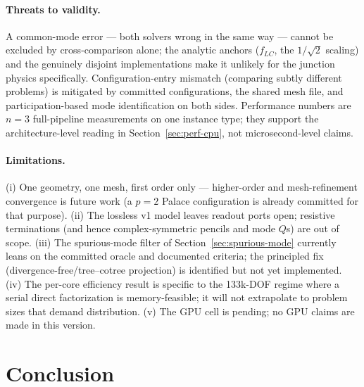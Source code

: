 \documentclass{anvil-paper}
\begin{document}
\paragraph{Threats to validity.}
A common-mode error --- both solvers wrong in the same way --- cannot be
excluded by cross-comparison alone; the analytic anchors ($f_{LC}$, the
$1/\sqrt{2}$ scaling) and the genuinely disjoint implementations make it
unlikely for the junction physics specifically. Configuration-entry
mismatch (comparing subtly different problems) is mitigated by committed
configurations, the shared mesh file, and participation-based mode
identification on both sides. Performance numbers are $n = 3$ full-pipeline
measurements on one instance type; they support the architecture-level
reading in Section~\ref{sec:perf-cpu}, not microsecond-level claims.

\paragraph{Limitations.}
(i) One geometry, one mesh, first order only --- higher-order and
mesh-refinement convergence is future work (a $p = 2$ Palace
configuration is already committed for that purpose). (ii) The lossless v1
model leaves readout ports open; resistive terminations (and hence
complex-symmetric pencils and mode $Q$s) are out of scope. (iii) The
spurious-mode filter of Section~\ref{sec:spurious-mode} currently leans on
the committed oracle and documented criteria; the principled fix
(divergence-free/tree--cotree projection) is identified but not yet
implemented. (iv) The per-core efficiency result is specific to the
133k-DOF regime where a serial direct factorization is memory-feasible;
it will not extrapolate to problem sizes that demand distribution.
(v) The GPU cell is pending; no GPU claims are made in this version.

\section{Conclusion}
\label{sec:conclusion}
\end{document}
